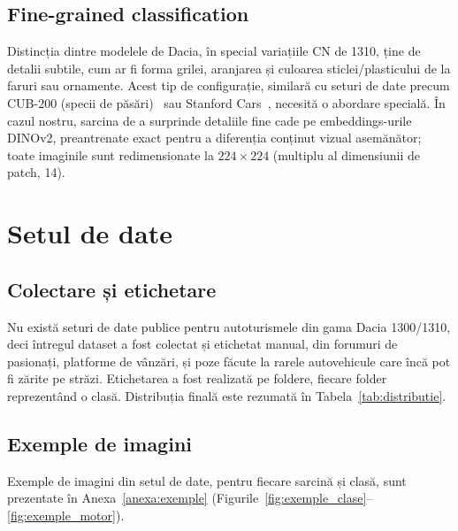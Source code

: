 \documentclass[12pt, a4paper, openany]{book}
\begin{document}
\section{Fine-grained classification}
Distincția dintre modelele de Dacia, în special variațiile CN de 1310, ține de detalii subtile, cum ar fi forma grilei, aranjarea și culoarea sticlei/plasticului de la faruri sau ornamente. Acest tip de configurație, similară cu seturi de date precum CUB-200 (specii de păsări)~\cite{wah2011cub} sau Stanford Cars~\cite{krause2013cars}, necesită o abordare specială. În cazul nostru, sarcina de a surprinde detaliile fine cade pe embeddings-urile DINOv2, preantrenate exact pentru a diferenția conținut vizual asemănător; toate imaginile sunt redimensionate la $224 \times 224$ (multiplu al dimensiunii de patch, 14).


\chapter{Setul de date}

\section{Colectare și etichetare}

Nu există seturi de date publice pentru autoturismele din gama Dacia 1300/1310, deci întregul dataset a fost colectat și etichetat manual, din forumuri de pasionați, platforme de vânzări, și poze făcute la rarele autovehicule care încă pot fi zărite pe străzi. Etichetarea a fost realizată pe foldere, fiecare folder reprezentând o clasă. Distribuția finală este rezumată în Tabela~\ref{tab:distributie}.



\section{Exemple de imagini}

Exemple de imagini din setul de date, pentru fiecare sarcină și clasă, sunt prezentate în Anexa~\ref{anexa:exemple} (Figurile~\ref{fig:exemple_clase}--\ref{fig:exemple_motor}).
\end{document}
